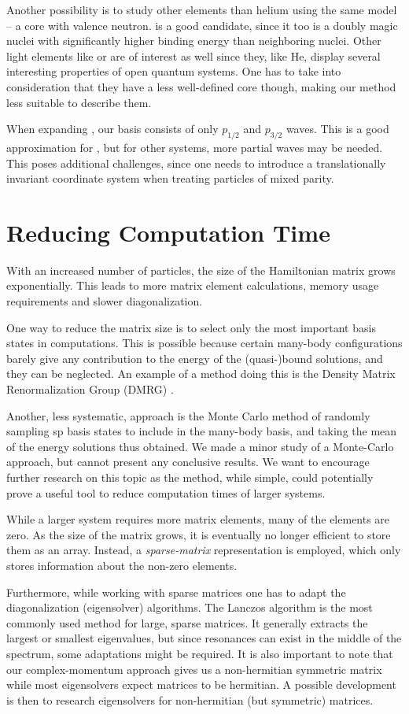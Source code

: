 \documentclass[../main/report.tex]{subfiles}
\begin{document}
Another possibility is to study other elements than helium using the same model -- a core with valence neutron.  is a good candidate, since it too is a doubly magic nuclei with significantly higher binding energy than neighboring nuclei.
Other light elements like  or  are of interest as well since they, like He, display several interesting properties of open quantum systems. One has to take into consideration that they have a less well-defined core though, making our method less suitable to describe them.

When expanding , our basis consists of only $p_{1/2}$ and $p_{3/2}$ waves. 
This is a good approximation for  \cite{gamow_shell_model_2008},  but for other systems, more partial waves may be needed.
This poses additional challenges, since one needs to introduce a translationally invariant coordinate system when treating particles of mixed parity. 

\section{Reducing Computation Time}
With an increased number of particles, the size of the Hamiltonian matrix grows exponentially. This leads to more matrix element calculations, memory usage requirements and slower diagonalization.

One way to reduce the matrix size is to select only the most important basis states in computations.
This is possible because certain many-body configurations barely give any contribution to the energy of the (quasi-)bound solutions, and they can be neglected. 
An example of a method doing this is the Density Matrix Renormalization Group (DMRG) \cite{DMRG}.

Another, less systematic, approach is the Monte Carlo method of randomly sampling sp basis states to include in the many-body basis, and taking the mean of the energy solutions thus obtained.
We made a minor study of a Monte-Carlo approach, but cannot present any conclusive results.
We want to encourage further research on this topic as the method, while simple, could potentially prove a useful tool to reduce computation times of larger systems.

While a larger system requires more matrix elements, many of the elements are zero. 
As the size of the matrix grows, it is eventually no longer efficient to store them as an array. 
Instead, a \emph{sparse-matrix} representation is employed, which only stores information about the non-zero elements. 

Furthermore, while working with sparse matrices one has to adapt the diagonalization (eigensolver) algorithms. 
The Lanczos algorithm is the most commonly used method for large, sparse matrices.
It generally extracts the largest or smallest eigenvalues, but since resonances can exist in the middle of the spectrum, some adaptations might be required.
It is also important to note that our complex-momentum approach gives us a non-hermitian symmetric matrix while most eigensolvers expect matrices to be hermitian. A possible development is then to research eigensolvers for non-hermitian (but symmetric) matrices.
\end{document}
